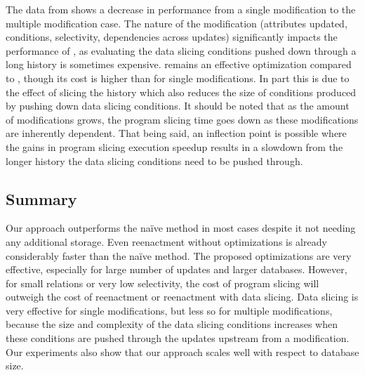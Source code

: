 The data from  shows a decrease in performance from a single modification to the multiple modification case. The nature of the modification (attributes updated, conditions, selectivity, dependencies across updates) significantly impacts the performance of \mrd, as evaluating the data slicing conditions pushed down through a long history is sometimes expensive. \mrdp remains an effective optimization compared to \mr, though its cost is higher than for single modifications. In part this is due to the effect of slicing the history which also reduces the size of conditions produced by pushing down  data slicing conditions. It should be noted that as the amount of modifications grows, the program slicing time goes down as these modifications are inherently dependent. That being said, an inflection point is possible where the gains in program slicing execution speedup results in a slowdown from the longer history the data slicing conditions need to be pushed through.


\subsection{Summary}
Our approach outperforms the naïve method in most cases despite it not needing any additional storage. Even reenactment without optimizations is already considerably faster than the naïve method.
The proposed optimizations are very effective, especially for large number of updates and larger databases. However, for small relations or very low selectivity, the cost of program slicing will outweigh the cost of reenactment or reenactment with data slicing. Data slicing is very effective for single modifications, but less so for multiple modifications, because the size and complexity of the data slicing conditions increases when these conditions are pushed through the updates upstream from a modification. Our experiments also show that our approach scales well with respect to database size.
%
%
%
%
%
%
%
%
%
%
%
%
%
%
%
%

%
%
%
%
%
%
%
%


